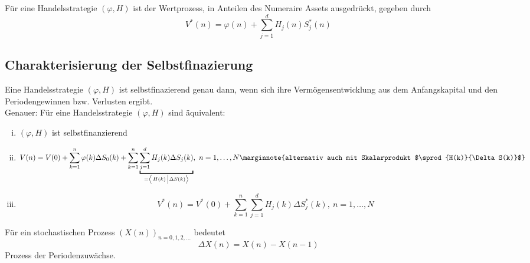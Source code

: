 Für eine Handelsstrategie $(\varphi,H)$ ist der Wertprozess, in Anteilen des Numeraire Assets ausgedrückt, gegeben durch
\[
V^*(n) = \varphi(n)+\sum_{j=1}^{d}H_j(n)S_j^*(n)
\]

\subsection{Charakterisierung der Selbstfinazierung}
\label{sub:charkt_selbstfinanzierung}
Eine Handelsstrategie $(\varphi,H)$ ist selbstfinazierend genau dann, wenn sich ihre Vermögensentwicklung aus dem Anfangskapital und den Periodengewinnen bzw. Verlusten ergibt.\\
Genauer: Für eine Handelsstrategie $(\varphi,H)$ sind äquivalent:
\begin{enumerate}[(i)]
	\item $(\varphi,H)$ ist selbstfinanzierend
	\item 
	\[
	V(n) = V(0)+\sum_{k=1}^{n}\varphi(k)\Delta S_0(k) + \sum_{k=1}^{n}\underbracket{\sum_{j=1}^{d}H_j(k)\Delta S_j(k)}_{=\sprod{H(k)}{\Delta S(k)}},~n=1,\dots,N
	\marginnote{alternativ auch mit Skalarprodukt $\sprod{H(k)}{\Delta S(k)}$}
	\]
	\item 
	\[
	V^*(n)= V^*(0)+\sum_{k=1}^{n}\sum_{j=1}^{d} H_j(k)\Delta S_j^*(k),~ n=1,\dots,N
	\]
\end{enumerate}
Für ein stochastischen Prozess $(X(n))_{n=0,1,2,\dots}$ bedeutet 
\[
\Delta X(n)= X(n)-X(n-1)
\]
Prozess der Periodenzuwächse.\\

